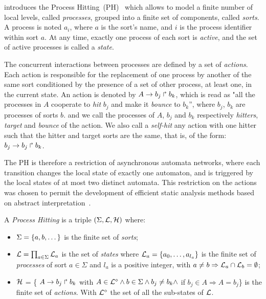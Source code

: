  introduces the Process Hitting~(PH)~\cite{PMR10-TCSB}
which allows to model a finite number of local levels,
called \emph{processes},
grouped into a finite set of components, called \emph{sorts}.
A process is noted $a_i$, where $a$ is the sort's name,
and $i$ is the process identifier within sort $a$.
At any time, exactly one process of each sort is \emph{active},
and the set of active processes is called a \emph{state}.

The concurrent interactions between processes are defined by a set of \emph{actions}.
Each action is responsible for the replacement of one process by another of the same sort
conditioned by the presence of a set of other process, at least one, in the current state.
An action is denoted by $A\rightarrow b_j\Rsh b_k$, which is read as "all the processes in $A$ cooperate to \emph{hit} $b_j$ and make it \emph{bounce} to $b_k$'',
where $b_j$, $b_k$ are processes of sorts $b$.
and we call the processes of $A$, $b_j$ and $b_k$  respectively \emph{hitters}, \emph{target} and
\emph{bounce} of the action.
We also call a \emph{self-hit} any action with one hitter such that the hitter and target sorts are the same,
that is, of the form: $b_j\rightarrow b_j\Rsh b_k$.

The PH is therefore a restriction of asynchronous automata networks, where each transition
changes the local state of exactly one automaton,
and is triggered by the local states of at most two distinct automata.
This restriction on the actions was chosen to permit
the development of efficient static analysis methods
based on abstract interpretation~\cite{PMR12-MSCS}.

\begin{definition}\label{def:PH}
  A \emph{Process Hitting} is a triple $(\Sigma,\mathcal{L},\mathcal{H})$ where:
  \begin{itemize}
    \item  $\Sigma = \{a,b,\dots\}$ is the finite set of \emph{sorts};
    \item  $\mathcal{L} = \prod_{a\in\Sigma} \mathcal{L}_a$ is the set of \emph{states} where
      $\mathcal{L}_a = \{a_0,\dots,a_{l_a}\}$
      is the finite set of \emph{processes} of sort $a\in\Sigma$
      and $l_a$ is a positive integer, with $a\neq b\Rightarrow \mathcal{L}_a \cap \mathcal{L}_b = \emptyset$;
    \item $\mathcal{H}$ = \{ $A\rightarrow b_j\Rsh b_k$ with $A \in \mathcal{L}^{\diamond} \wedge b \in \Sigma \wedge b_j \neq b_k \wedge$ if $b_j \in A \Rightarrow A=b_j$\} is the finite set of \emph{actions}.
    With $\mathcal{L}^{\diamond}$ the set of all the sub-states of $\mathcal{L}$.    
  \end{itemize}
\end{definition}

